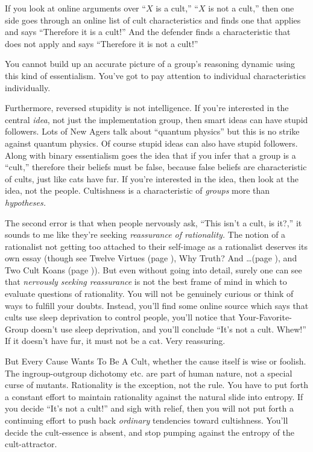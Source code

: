 {
 If you look at online arguments over ``$X$ is a
cult,'' ``$X$ is not a
cult,'' then one side goes through an online list of
cult characteristics and finds one that applies and says
``Therefore it is a cult!'' And the
defender finds a characteristic that does not apply and says
``Therefore it is not a cult!''}

{
 You cannot build up an accurate picture of a
group's reasoning dynamic using this kind of
essentialism. You've got to pay attention to individual
characteristics individually.}

{
 Furthermore, reversed stupidity is not intelligence. If
you're interested in the central \textit{idea}, not
just the implementation group, then smart ideas can have stupid
followers. Lots of New Agers talk about ``quantum
physics'' but this is no strike against quantum
physics. Of course stupid ideas can also have stupid followers. Along
with binary essentialism goes the idea that if you infer that a group
is a ``cult,'' therefore their
beliefs must be false, because false beliefs are characteristic of
cults, just like cats have fur. If you're interested in
the idea, then look at the idea, not the people. Cultishness is a
characteristic of \textit{groups} more than \textit{hypotheses.}}

{
 The second error is that when people nervously ask,
``This isn't a cult, is
it?,'' it sounds to me like they're
seeking \textit{reassurance of rationality.} The notion of a
rationalist not getting too attached to their self-image as a
rationalist deserves its own essay (though see Twelve Virtues (page \pageref{twelve_virtues}), Why
Truth? And \ldots (page \pageref{why_truth}), and Two Cult Koans (page \pageref{two_cult_koans})). But even without going into
detail, surely one can see that \textit{nervously seeking reassurance}
is not the best frame of mind in which to evaluate questions of
rationality. You will not be genuinely curious or think of ways to
fulfill your doubts. Instead, you'll find some online
source which says that cults use sleep deprivation to control people,
you'll notice that Your-Favorite-Group
doesn't use sleep deprivation, and
you'll conclude ``It's
not a cult. Whew!'' If it doesn't
have fur, it must not be a cat. Very reassuring.}

{
 But Every Cause Wants To Be A Cult, whether the cause itself is
wise or foolish. The ingroup-outgroup dichotomy etc. are part of human
nature, not a special curse of mutants. Rationality is the exception,
not the rule. You have to put forth a constant effort to maintain
rationality against the natural slide into entropy. If you decide
``It's not a cult!''
and sigh with relief, then you will not put forth a continuing effort
to push back \textit{ordinary} tendencies toward cultishness.
You'll decide the cult-essence is absent, and stop
pumping against the entropy of the cult-attractor.}

